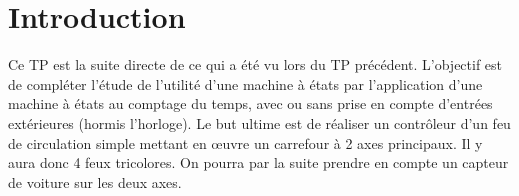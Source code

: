 \chapter{Introduction}

Ce TP est la suite directe de ce qui a été vu lors du TP précédent. L’objectif est de compléter l'étude de l'utilité d'une machine à états par l’application d’une machine à états au comptage du temps, avec ou sans prise en compte d’entrées extérieures (hormis l’horloge). Le but ultime est de réaliser un contrôleur d’un feu de circulation simple mettant en \oe uvre un carrefour à 2 axes principaux. Il y aura donc 4 feux tricolores. On pourra par la suite prendre en compte un capteur de voiture sur les deux axes.
